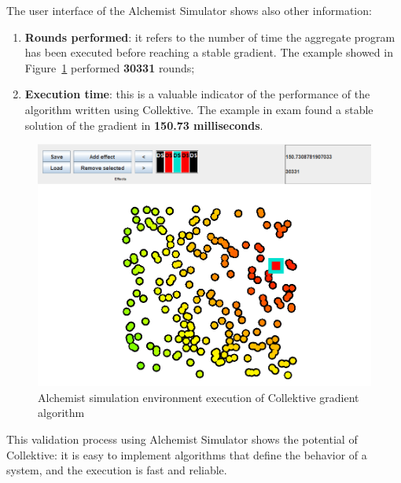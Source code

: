 The user interface of the Alchemist Simulator shows also other information:
\begin{enumerate}
    \item \textbf{Rounds performed}: it refers to the number of time the aggregate program has been executed before reaching a stable gradient. The example showed in Figure~\ref{fig:collektive_simulation_completed} performed \textbf{30331} rounds;
    \item \textbf{Execution time}: this is a valuable indicator of the performance of the algorithm written using Collektive. The example in exam found a stable solution of the gradient in \textbf{150.73 milliseconds}.
\end{enumerate}
\begin{figure}[!ht]
    \centering
    \includegraphics[scale=0.75]{document/chapters/4-collektive/images/collektive_simulation_completed.png}
    \caption{Alchemist simulation environment execution of Collektive gradient algorithm}
    \label{fig:collektive_simulation_completed}
\end{figure}

This validation process using Alchemist Simulator shows the potential of Collektive: it is easy to implement algorithms that define the behavior of a system, and the execution is fast and reliable.